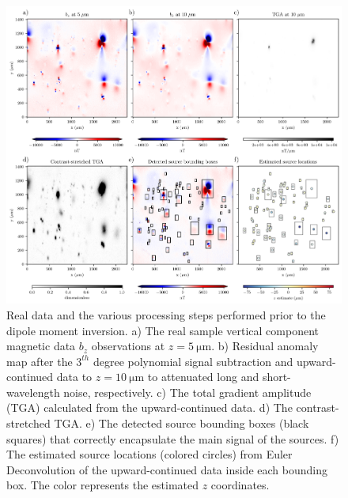 \begin{figure}[tb!]
\centering
\includegraphics[width=1\linewidth]{figures/real-data.png}
\caption{Real data and the various processing steps performed prior to the dipole moment inversion.
    a) The real sample vertical component magnetic data $b_z$ observations at
    $z = \qty{5}{\um}$.
    b) Residual anomaly map after the $3^{th}$ degree polynomial signal subtraction and upward-continued data to $z = \qty{10}{\um}$ to attenuated long and short-wavelength noise, respectively.
    c) The total gradient amplitude (TGA) calculated from the
    upward-continued data.
    d) The contrast-stretched TGA.
    e) The detected source bounding boxes (black squares) that correctly
    encapsulate the main signal of the sources.
    f) The estimated source locations (colored circles) from Euler
    Deconvolution of the upward-continued data inside each bounding box.
    The color represents the estimated $z$ coordinates.
  }
\label{real-data}
\end{figure}

